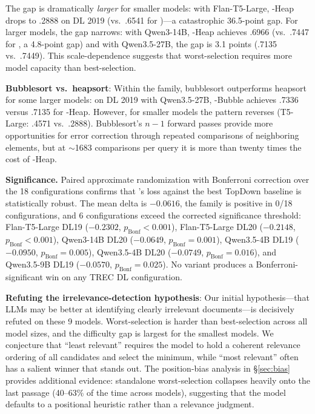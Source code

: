 The gap is dramatically \emph{larger} for smaller models: with Flan-T5-Large, \bottomup{}-Heap drops to .2888 on DL 2019 (vs.\ .6541 for \topdown{})---a catastrophic 36.5-point gap. For larger models, the gap narrows: with Qwen3-14B, \bottomup{}-Heap achieves .6966 (vs.\ .7447 for \topdown{}, a 4.8-point gap) and with Qwen3.5-27B, the gap is 3.1 points (.7135 vs.\ .7449). This scale-dependence suggests that worst-selection requires more model capacity than best-selection.

\textbf{Bubblesort vs.\ heapsort}: Within the \bottomup{} family, bubblesort outperforms heapsort for some larger models: on DL 2019 with Qwen3.5-27B, \bottomup{}-Bubble achieves .7336 versus .7135 for \bottomup{}-Heap. However, for smaller models the pattern reverses (T5-Large: .4571 vs.\ .2888). Bubblesort's $n-1$ forward passes provide more opportunities for error correction through repeated comparisons of neighboring elements, but at $\sim$1683 comparisons per query it is more than twenty times the cost of \topdown{}-Heap.

\textbf{Significance.} Paired approximate randomization with Bonferroni correction over the 18 configurations confirms that \bottomup{}'s loss against the best TopDown baseline is statistically robust. The mean delta is $-0.0616$, the family is positive in 0/18 configurations, and 6 configurations exceed the corrected significance threshold: Flan-T5-Large DL19 ($-0.2302$, $p_\text{Bonf}<0.001$), Flan-T5-Large DL20 ($-0.2148$, $p_\text{Bonf}<0.001$), Qwen3-14B DL20 ($-0.0649$, $p_\text{Bonf}=0.001$), Qwen3.5-4B DL19 ($-0.0950$, $p_\text{Bonf}=0.005$), Qwen3.5-4B DL20 ($-0.0749$, $p_\text{Bonf}=0.016$), and Qwen3.5-9B DL19 ($-0.0570$, $p_\text{Bonf}=0.025$). No \bottomup{} variant produces a Bonferroni-significant win on any TREC DL configuration.

\textbf{Refuting the irrelevance-detection hypothesis}: Our initial hypothesis---that LLMs may be better at identifying clearly irrelevant documents---is decisively refuted on these 9 models. Worst-selection is harder than best-selection across all model sizes, and the difficulty gap is largest for the smallest models. We conjecture that ``least relevant'' requires the model to hold a coherent relevance ordering of all candidates and select the minimum, while ``most relevant'' often has a salient winner that stands out. The position-bias analysis in \S\ref{sec:bias} provides additional evidence: standalone worst-selection collapses heavily onto the last passage (40--63\% of the time across models), suggesting that the model defaults to a positional heuristic rather than a relevance judgment.


